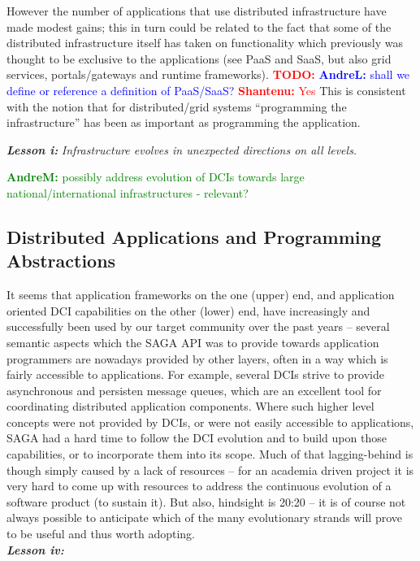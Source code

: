 \documentclass{article}
\newcommand{\I}[1]{\textit{#1}}
\newcommand{\B}[1]{\textbf{#1}}
\newcommand{\BI}[1]{\textbf{\textit{#1}}}
\newcommand{\todo}[1]{{\textcolor{red}{\B{TODO:} #1 }}}
\newcommand{\jhanote}[1]{{\textcolor{red}{     \B{Shantenu:} #1 }}}
\newcommand{\amnote}[1]{{\textcolor{green}{   \B{AndreM:  } #1 }}}
\newcommand{\alnote}[1]{{\textcolor{blue}{    \B{AndreL:  } #1 }}}
\newcommand{\todo}[1]{}
\newcommand{\jhanote}[1]{}
\newcommand{\amnote}[1]{}
\newcommand{\alnote}[1]{}
\begin{document}
  However the number of applications that use distributed infrastructure
  have made modest gains; this in turn could be related to the fact that
  some of the distributed infrastructure itself has taken on
  functionality which previously was thought to be exclusive to the
  applications (see PaaS and SaaS, but also grid services,
  portals/gateways and runtime frameworks). \todo{}\alnote{shall we
  define or reference a definition of PaaS/SaaS?}\jhanote{Yes} This is
  consistent with the notion that for distributed/grid systems
  ``programming the infrastructure'' has been as important as
  programming the application.

  \BI{Lesson i:} \I{Infrastructure evolves in unexpected directions  on all
  levels.}

  \amnote{possibly address evolution of DCIs towards large
  national/international infrastructures - relevant?}


 \subsection{Distributed Applications and Programming Abstractions}

  It seems that application frameworks on the one (upper) end, and
  application oriented DCI capabilities on the other (lower) end, have
  increasingly and successfully been used by our target community over
  the past years -- several semantic aspects which the SAGA API was to
  provide towards application programmers are nowadays provided by other
  layers, often in a way which is fairly accessible to applications.
  For example, several DCIs strive to provide asynchronous and persisten
  message queues, which are an excellent tool for coordinating
  distributed application components.  Where such higher level concepts
  were not provided by DCIs, or were not easily accessible to
  applications, SAGA had a hard time to follow the DCI evolution and to
  build upon those capabilities, or to incorporate them into its scope.
  Much of that lagging-behind is though simply caused by a lack of
  resources -- for an academia driven project it is very hard to come up
  with resources to address the continuous evolution of a software
  product (to sustain it).  But also, hindsight is 20:20 -- it is of
  course not always possible to anticipate which of the many
  evolutionary strands will prove to be useful and thus worth
  adopting.\\
  \BI{Lesson iv:} 

\end{document}
